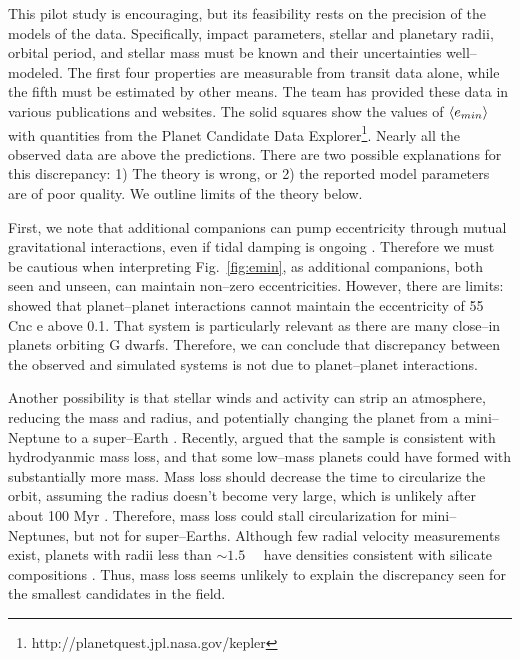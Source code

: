 This pilot study is encouraging, but its feasibility rests on the
precision of the models of the \kepler data.  Specifically, impact
parameters, stellar and planetary radii, orbital period, and stellar
mass must be known and their uncertainties well--modeled.  The first
four properties are measurable from transit data alone, while the
fifth must be estimated by other means.  The \kepler team has provided
these data in various publications and websites.  The solid squares
show the values of $\left< e_{min} \right>$ with quantities from the
\kepler Planet Candidate Data
Explorer\footnote{http://planetquest.jpl.nasa.gov/kepler}.  Nearly all
the observed data are above the predictions. There are two possible
explanations for this discrepancy: 1) The theory is wrong, or 2) the
reported model parameters are of poor quality.  We outline limits of
the theory below.

\medskip
{\centerline{}}
\smallskip

First, we note that additional companions can pump eccentricity
through mutual gravitational interactions, even if tidal damping is
ongoing \citep{MardlingLin02,Bolmont13}.  Therefore we must be
cautious when interpreting Fig.~\ref{fig:emin}, as additional
companions, both seen and unseen, can maintain non--zero
eccentricities.  However, there are limits: \cite{Bolmont13} showed
that planet--planet interactions cannot maintain the eccentricity of
55 Cnc e above 0.1.  That system is particularly relevant as there are
many close--in planets orbiting G dwarfs.  Therefore, we can conclude
that discrepancy between the observed and simulated systems is not due
to planet--planet interactions.

Another possibility is that stellar winds and activity can strip an
atmosphere, reducing the mass and radius, and potentially changing the
planet from a mini--Neptune to a super--Earth
\citep{Jackson10,Valencia10,Leitzinger11,Poppenhaeger12}.  Recently,
\cite{OwenWu13} argued that the \kepler sample is consistent with
hydrodyanmic mass loss, and that some low--mass planets could have
formed with substantially more mass.  Mass loss should decrease the
time to circularize the orbit, assuming the radius doesn't become very
large, which is unlikely after about 100 Myr \citep{Lopez12}.
Therefore, mass loss could stall circularization for mini--Neptunes,
but not for super--Earths.  Although few radial velocity measurements
exist, planets with radii less than $\sim 1.5$~\rearth~ have densities
consistent with silicate compositions \citep{Batalha10}.  Thus, mass
loss seems unlikely to explain the discrepancy seen for the smallest
candidates in the \kepler field.


